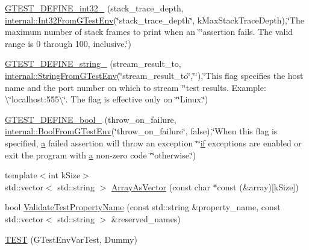 \begin{DoxyCompactItemize}
\hyperlink{namespacetesting_aaedd7015b957f3c37662c289b645e7d9}{G\+T\+E\+S\+T\+\_\+\+D\+E\+F\+I\+N\+E\+\_\+int32\+\_\+} (stack\+\_\+trace\+\_\+depth, \hyperlink{namespacetesting_1_1internal_a0f7e728793f9e6cb0aa2b69eaa468bf3}{internal\+::\+Int32\+From\+G\+Test\+Env}(\char`\"{}stack\+\_\+trace\+\_\+depth\char`\"{}, k\+Max\+Stack\+Trace\+Depth),\char`\"{}The maximum number of stack frames to print when an \char`\"{}\char`\"{}assertion fails.  The valid range is 0 through 100, inclusive.\char`\"{})
\item 
\hyperlink{namespacetesting_a0422a6f971513cf559a8575a0533b235}{G\+T\+E\+S\+T\+\_\+\+D\+E\+F\+I\+N\+E\+\_\+string\+\_\+} (stream\+\_\+result\+\_\+to, \hyperlink{namespacetesting_1_1internal_ac54dabc540bf79c2de91add679bfb93b}{internal\+::\+String\+From\+G\+Test\+Env}(\char`\"{}stream\+\_\+result\+\_\+to\char`\"{},\char`\"{}\char`\"{}),\char`\"{}This flag specifies the host name and the port number on which to stream \char`\"{}\char`\"{}test results. Example\+: \textbackslash{}\char`\"{}localhost\+:555\textbackslash{}\char`\"{}. The flag is effective only on \char`\"{}\char`\"{}Linux.\char`\"{})
\item 
\hyperlink{namespacetesting_a05ff4385edff6d44f6823f5eade7abe2}{G\+T\+E\+S\+T\+\_\+\+D\+E\+F\+I\+N\+E\+\_\+bool\+\_\+} (throw\+\_\+on\+\_\+failure, \hyperlink{namespacetesting_1_1internal_a67132cdce23fb71b6c38ee34ef81eb4c}{internal\+::\+Bool\+From\+G\+Test\+Env}(\char`\"{}throw\+\_\+on\+\_\+failure\char`\"{}, false),\char`\"{}When this flag is specified, \hyperlink{_07copy_08_2_read_camera_model_8m_a551a3d351eadcc0b9b1a2f24f0fb5ea0}{a} failed assertion will throw an exception \char`\"{}\char`\"{}\hyperlink{jquery_8js_a42cbfadee2b4749e8f699ea8d745a0e4}{if} exceptions are enabled or exit the program with \hyperlink{_07copy_08_2_read_camera_model_8m_a551a3d351eadcc0b9b1a2f24f0fb5ea0}{a} non-\/zero code \char`\"{}\char`\"{}otherwise.\char`\"{})
\item 
{\footnotesize template$<$int k\+Size$>$ }\\std\+::vector$<$ std\+::string $>$ \hyperlink{namespacetesting_a956d4c522454fa6dfd75b5bbbefe8f9e}{Array\+As\+Vector} (const char $\ast$const (\&array)\mbox{[}k\+Size\mbox{]})
\item 
bool \hyperlink{namespacetesting_a4c9bd414747bf0563bfdb32a2307dcdf}{Validate\+Test\+Property\+Name} (const std\+::string \&property\+\_\+name, const std\+::vector$<$ std\+::string $>$ \&reserved\+\_\+names)
\item 
\hyperlink{namespacetesting_af4187d1b48a2812f1335721ed8f30a99}{T\+E\+ST} (G\+Test\+Env\+Var\+Test, Dummy)

\end{DoxyCompactItemize}
